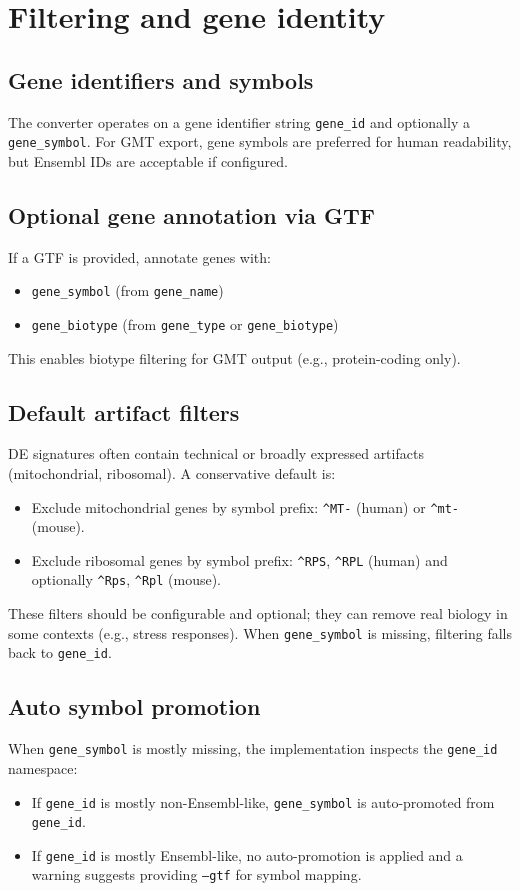 \documentclass[11pt]{article}
\begin{document}
\section{Filtering and gene identity}
\subsection{Gene identifiers and symbols}
The converter operates on a gene identifier string \texttt{gene\_id} and optionally a \texttt{gene\_symbol}.
For GMT export, gene symbols are preferred for human readability, but Ensembl IDs are acceptable if configured.

\subsection{Optional gene annotation via GTF}
If a GTF is provided, annotate genes with:
\begin{itemize}[leftmargin=2em]
\item \texttt{gene\_symbol} (from \texttt{gene\_name})
\item \texttt{gene\_biotype} (from \texttt{gene\_type} or \texttt{gene\_biotype})
\end{itemize}
This enables biotype filtering for GMT output (e.g., protein-coding only).

\subsection{Default artifact filters}
DE signatures often contain technical or broadly expressed artifacts (mitochondrial, ribosomal). A conservative default is:
\begin{itemize}[leftmargin=2em]
\item Exclude mitochondrial genes by symbol prefix: \texttt{\^{ }MT-} (human) or \texttt{\^{ }mt-} (mouse).
\item Exclude ribosomal genes by symbol prefix: \texttt{\^{ }RPS}, \texttt{\^{ }RPL} (human) and optionally \texttt{\^{ }Rps}, \texttt{\^{ }Rpl} (mouse).
\end{itemize}
These filters should be configurable and optional; they can remove real biology in some contexts (e.g., stress responses).
When \texttt{gene\_symbol} is missing, filtering falls back to \texttt{gene\_id}.

\subsection{Auto symbol promotion}
When \texttt{gene\_symbol} is mostly missing, the implementation inspects the \texttt{gene\_id} namespace:
\begin{itemize}[leftmargin=2em]
\item If \texttt{gene\_id} is mostly non-Ensembl-like, \texttt{gene\_symbol} is auto-promoted from \texttt{gene\_id}.
\item If \texttt{gene\_id} is mostly Ensembl-like, no auto-promotion is applied and a warning suggests providing \texttt{--gtf} for symbol mapping.
\end{itemize}
\end{document}
